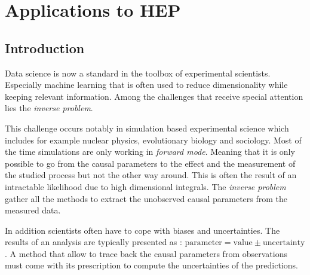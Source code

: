 
\chapter{Applications to HEP}
\label{chap:applications}
\ifpdf
    \graphicspath{{Chapter5/Figs/Raster/}{Chapter5/Figs/PDF/}{Chapter5/Figs/}}
\else
    \graphicspath{{Chapter5/Figs/Vector/}{Chapter5/Figs/}}
\fi




\section{Introduction}


Data science is now a standard in the toolbox of experimental scientists.
Especially machine learning that is often used to reduce dimensionality while keeping relevant information.
Among the challenges that receive special attention lies the \emph{inverse problem}.

This challenge occurs notably in simulation based experimental science which includes for example nuclear physics, evolutionary biology and sociology.
Most of the time simulations are only working in \emph{forward mode}.
Meaning that it is only possible to go from the causal parameters to the effect and the measurement of the studied process but not the other way around.
This is often the result of an intractable likelihood due to high dimensional integrals.
The \emph{inverse problem} gather all the methods to extract the unobserved causal parameters from the measured data.

In addition scientists often have to cope with biases and uncertainties.
The results of an analysis are typically presented as : $\text{parameter} = \text{value} \pm \text{uncertainty}$.
A method that allow to trace back the causal parameters from observations must come with its prescription to compute the uncertainties of the predictions.

